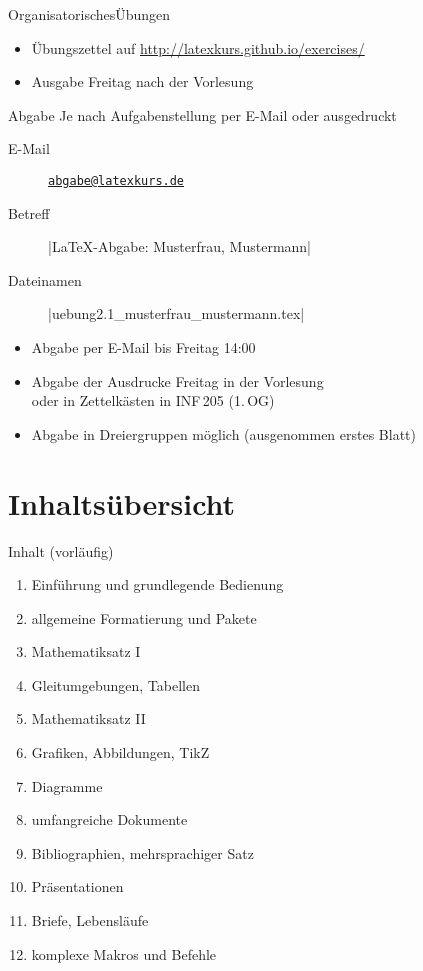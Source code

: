 \documentclass[
	vorläufig=false,
	datum=2017-10-20,
	titel={Einführung und grundlegende Bedienung},
	web=true,
	max,
	mo,
	aspectratio=1610,
]{../tex/latexkurs-slides}
\begin{document}
\begin{frame}[fragile, t]{Organisatorisches}{Übungen}
		\begin{itemize}
			\item Übungszettel auf \url{http://latexkurs.github.io/exercises/}
			\item Ausgabe Freitag nach der Vorlesung
		\end{itemize}
	\pause
	\begin{block}{Abgabe}
	Je nach Aufgabenstellung per E-Mail oder ausgedruckt
		\begin{description}
			\item[E-Mail] \href{mailto:abgabe@latexkurs.de}{\texttt{abgabe@latexkurs.de}}\\
			\item[Betreff] |LaTeX-Abgabe: Musterfrau, Mustermann|\\
			\item[Dateinamen] |uebung2.1_musterfrau_mustermann.tex|
		\end{description}
		\vspace{-1ex}
		\begin{itemize}
			\item Abgabe per E-Mail bis Freitag 14:00
			\item Abgabe der Ausdrucke Freitag in der Vorlesung\\oder in Zettelkästen in INF\,205 (1.\,OG)
			\item Abgabe in Dreiergruppen möglich (ausgenommen erstes Blatt)
		\end{itemize}
	\end{block}
\end{frame}





\section{Inhaltsübersicht}

\begin{frame}{Inhalt (vorläufig)}
	\begin{enumerate}
		\item Einführung und grundlegende Bedienung
		\item allgemeine Formatierung und Pakete
		\item Mathematiksatz I
		\item Gleitumgebungen, Tabellen
		\item Mathematiksatz II
		\item Grafiken, Abbildungen, TikZ
		\item Diagramme
		\item umfangreiche Dokumente
		\item Bibliographien, mehrsprachiger Satz
		\item Präsentationen
		\item Briefe, Lebensläufe
		\item komplexe Makros und Befehle
	\end{enumerate}
\end{frame}
\end{document}

